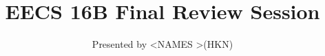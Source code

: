 

\title{EECS 16B Final Review Session}
\author{Presented by \textless NAMES \textgreater (HKN)}
\date{}

\newcommand{\SlideAccessingLogistics}{@\#}










